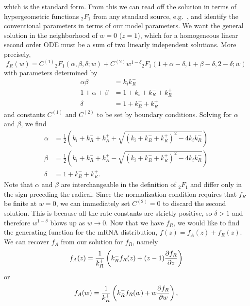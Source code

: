 which is the standard form. From this we can read off the solution in terms of
hypergeometric functions ${_2F_1}$ from any standard source,
e.g.~\cite{Abramowitz1964}, and identify the conventional parameters in terms of
our model parameters. We want the general solution in the neighborhood of $w=0$
($z=1$), which for a homogeneous linear second order ODE must be a sum of two
linearly independent solutions. More precisely, 
\begin{equation}
f_R(w) = C^{(1)} {_2F_1}(\alpha, \beta, \delta; w)
+ C^{(2)} w^{1-\delta}{_2F_1}(1+\alpha-\delta, 1+\beta-\delta, 2-\delta; w)
\end{equation}
with parameters determined by
\begin{equation}
\begin{split}
\alpha\beta &= k_i k_R^-
\\
1+\alpha+\beta &= 1+k_i+k_R^-+k_R^+
\\
\delta &= 1 + k_R^- + k_R^+
\end{split}
\end{equation}
and constants $C^{(1)}$ and $C^{(2)}$ to be set by boundary conditions. Solving for
$\alpha$ and $\beta$, we find
\begin{equation}
\begin{split}
\alpha &= \frac{1}{2}
\left(k_i+k_R^-+k_R^+ + \sqrt{(k_i+k_R^-+k_R^+)^2 - 4k_i k_R^-}\right)
\\
\beta &= \frac{1}{2}
\left(k_i+k_R^-+k_R^+ - \sqrt{(k_i+k_R^-+k_R^+)^2 - 4k_i k_R^-}\right)
\\
\delta &= 1 + k_R^- + k_R^+.
\end{split}
\end{equation}
Note that $\alpha$ and $\beta$ are interchangeable in the definition of
${_2F_1}$ and differ only in the sign preceding the radical.
Since the normalization condition requires that $f_R$ be finite at $w=0$,
we can immediately set $C^{(2)}=0$ to discard the second solution.
This is because all the rate constants are strictly positive,
so $\delta>1$ and therefore $w^{1-\delta}$ blows up as $w\rightarrow0$.
Now that we have $f_R$, we would like to find the generating function
for the mRNA distribution, $f(z) = f_A(z) + f_R(z)$.
We can recover $f_A$ from our solution for $f_R$, namely
\begin{equation}
f_A(z) = \frac{1}{k_R^+}\left(k_R^- f_R(z) + (z-1) \pderiv[f_R]{z}\right)
\end{equation}
or
\begin{equation}
f_A(w) = \frac{1}{k_R^+}\left(k_R^- f_R(w) + w \pderiv[f_R]{w}\right),
\end{equation}

